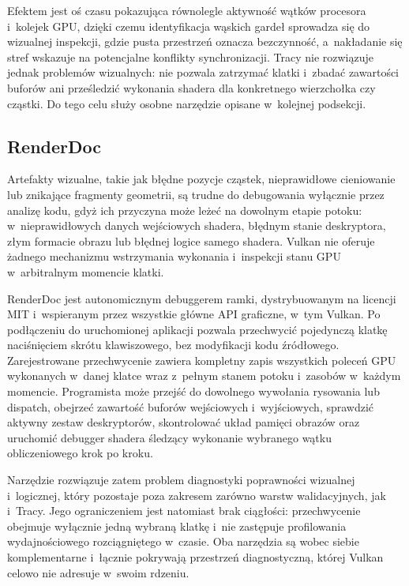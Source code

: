 Efektem jest oś czasu pokazująca równolegle aktywność wątków procesora i~kolejek GPU,
dzięki czemu identyfikacja wąskich gardeł sprowadza się do wizualnej inspekcji, gdzie
pusta przestrzeń oznacza bezczynność, a~nakładanie się stref wskazuje na potencjalne
konflikty synchronizacji. Tracy nie rozwiązuje jednak problemów wizualnych: nie pozwala
zatrzymać klatki i~zbadać zawartości buforów ani prześledzić wykonania shadera dla
konkretnego wierzchołka czy cząstki. Do tego celu służy osobne narzędzie opisane
w~kolejnej podsekcji.

\subsection{RenderDoc}

Artefakty wizualne, takie jak błędne pozycje cząstek, nieprawidłowe cieniowanie
lub znikające fragmenty geometrii, są trudne do debugowania wyłącznie przez analizę kodu,
gdyż ich przyczyna może leżeć na dowolnym etapie potoku: w~nieprawidłowych danych
wejściowych shadera, błędnym stanie deskryptora, złym formacie obrazu lub błędnej
logice samego shadera. Vulkan nie oferuje żadnego mechanizmu wstrzymania wykonania
i~inspekcji stanu GPU w~arbitralnym momencie klatki.

RenderDoc \cite{renderdoc} jest autonomicznym debuggerem ramki, dystrybuowanym na
licencji MIT i~wspieranym przez wszystkie główne API graficzne, w~tym Vulkan. Po podłączeniu
do uruchomionej aplikacji pozwala przechwycić pojedynczą klatkę naciśnięciem skrótu
klawiszowego, bez modyfikacji kodu źródłowego. Zarejestrowane przechwycenie zawiera
kompletny zapis wszystkich poleceń GPU wykonanych w~danej klatce wraz z~pełnym stanem
potoku i~zasobów w~każdym momencie. Programista może przejść do dowolnego wywołania
rysowania lub dispatch, obejrzeć zawartość buforów wejściowych i~wyjściowych, sprawdzić
aktywny zestaw deskryptorów, skontrolować układ pamięci obrazów oraz uruchomić
debugger shadera śledzący wykonanie wybranego wątku obliczeniowego krok po kroku.

Narzędzie rozwiązuje zatem problem diagnostyki poprawności wizualnej i~logicznej,
który pozostaje poza zakresem zarówno warstw walidacyjnych, jak i~Tracy.
Jego ograniczeniem jest natomiast brak ciągłości: przechwycenie obejmuje wyłącznie
jedną wybraną klatkę i~nie zastępuje profilowania wydajnościowego rozciągniętego
w~czasie. Oba narzędzia są wobec siebie komplementarne i~łącznie pokrywają przestrzeń
diagnostyczną, której Vulkan celowo nie adresuje w~swoim rdzeniu.

